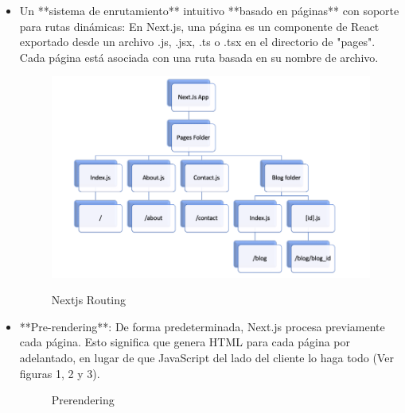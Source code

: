 \documentclass[12pt,twoside,titlepage]{report}
\begin{document}
\begin{itemize}
    \item Un **sistema de enrutamiento** intuitivo **basado en páginas** con soporte para rutas dinámicas: En Next.js, una página es un componente de React exportado desde un archivo .js, .jsx, .ts o .tsx en el directorio de "pages". Cada página está asociada con una ruta basada en su nombre de archivo.
    \begin{figure}[H]
        \centering
        \includegraphics[scale=0.4]{Nextjs/Routing}
        \label{fig:nextjs_routing}
        \caption{Nextjs Routing}
    \end{figure}
    
    \item **Pre-rendering**: De forma predeterminada, Next.js procesa previamente cada página. Esto significa que genera HTML para cada página por adelantado, en lugar de que JavaScript del lado del cliente lo haga todo (Ver figuras 1, 2 y 3). 
    \begin{figure}[H]
        \centering
        \caption{Prerendering}
        \label{f:Prerendering}
       \end{figure}


\end{itemize}
\end{document}
